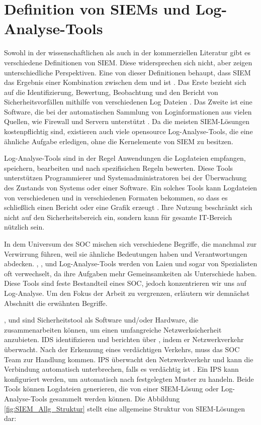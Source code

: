 \section{Definition von SIEMs und Log-Analyse-Tools}

Sowohl in der wissenschaftlichen als auch in der kommerziellen Literatur gibt es verschiedene Definitionen von \gls{SIEM}. Diese widersprechen sich nicht, aber zeigen unterschiedliche Perspektiven. Eine von dieser Definitionen behaupt, dass \gls{SIEM} das Ergebnis einer Kombination zwischen dem  und  ist \citep{Dorigo_SIEM}. Das Erste bezieht sich auf die Identifizierung, Bewertung, Beobachtung und den Bericht von Sicherheitsvorfällen mithilfe von verschiedenen Log Dateien \citep{techopedia_SEM}. Das Zweite ist eine Software, die bei der automatischen Sammlung von Loginformationen aus vielen Quellen, wie Firewall und Servern unterstützt \citep{techopedia_SIM}. Da die meisten \gls{SIEM}-Lösungen kostenpflichtig sind, existieren auch viele \gls{opensource} Log-Analyse-Tools, die eine ähnliche Aufgabe erledigen, ohne die Kernelemente von \gls{SIEM} zu besitzen. 

Log-Analyse-Tools sind in der Regel Anwendungen die Logdateien empfangen, speichern, bearbeiten und nach spezifisichen Regeln bewerten. Diese Tools unterstützen Programmierer und Systemadministratoren bei der Überwachung des Zustands von Systems oder einer Software. Ein solches Tools kann Logdateien von verschiedenen  und in verschiedenen Formaten bekommen, so dass es schließlich einen Bericht oder eine Grafik erzeugt \citep{Korzeniowski_LATDef}. Ihre Nutzung beschränkt sich nicht auf den Sicherheitsbereich ein, sondern kann für gesamte IT-Bereich nützlich sein.

In dem Universum des \gls{SOC} mischen sich verschiedene Begriffe, die manchmal zur Verwirrung führen, weil sie ähnliche Bedeutungen haben und Verantwortungen abdecken. , ,  und Log-Analyse-Tools werden von Laien und sogar von Spezialisten oft verwechselt, da ihre Aufgaben mehr Gemeinsamkeiten als Unterschiede haben. Diese Tools sind feste Bestandteil eines \gls{SOC}, jedoch konzentrieren wir uns auf Log-Analyse. Um den Fokus der Arbeit zu vergrenzen, erläutern wir demnächst Abschnitt die erwähnten Begriffe.

,  und  sind Sicherheitstool als Software und/oder Hardware, die zusammenarbeiten können, um einen umfangreiche Netzwerksicherheit anzubieten. \gls{IDS} identifizieren und berichten über , indem er Netzwerkverkehr überwacht. Nach der Erkennung eines verdächtigen Verkehrs, muss das \gls{SOC} Team zur Handlung kommen. \gls{IPS} überwacht den Netzwerkverkehr und kann die Verbindung automatisch unterbrechen, falls es verdächtig ist \citep{Wendzel_IS}. Ein \gls{IPS} kann konfiguriert werden, um automatisch nach festgelegten Muster zu handeln. Beide Tools können Logdateien generieren, die von einer \gls{SIEM}-Lösung oder Log-Analyse-Tools gesammelt werden können. Die Abbildung \ref{fig:SIEM_Allg_Struktur} stellt eine allgemeine Struktur von \gls{SIEM}-Lösungen dar:

